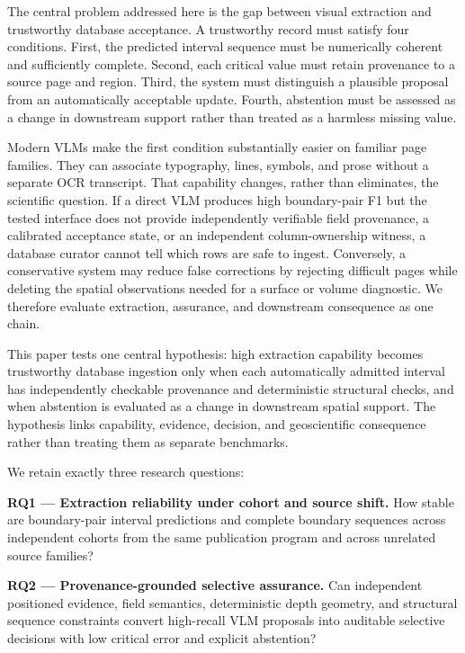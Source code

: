 \documentclass[a4paper,fleqn]{cas-sc}
\begin{document}
The central problem addressed here is the gap between visual extraction and trustworthy database acceptance. A trustworthy record must satisfy four conditions. First, the predicted interval sequence must be numerically coherent and sufficiently complete. Second, each critical value must retain provenance to a source page and region. Third, the system must distinguish a plausible proposal from an automatically acceptable update. Fourth, abstention must be assessed as a change in downstream support rather than treated as a harmless missing value.

Modern VLMs make the first condition substantially easier on familiar page families. They can associate typography, lines, symbols, and prose without a separate OCR transcript. That capability changes, rather than eliminates, the scientific question. If a direct VLM produces high boundary-pair F1 but the tested interface does not provide independently verifiable field provenance, a calibrated acceptance state, or an independent column-ownership witness, a database curator cannot tell which rows are safe to ingest. Conversely, a conservative system may reduce false corrections by rejecting difficult pages while deleting the spatial observations needed for a surface or volume diagnostic. We therefore evaluate extraction, assurance, and downstream consequence as one chain.

This paper tests one central hypothesis: high extraction capability becomes trustworthy database ingestion only when each automatically admitted interval has independently checkable provenance and deterministic structural checks, and when abstention is evaluated as a change in downstream spatial support. The hypothesis links capability, evidence, decision, and geoscientific consequence rather than treating them as separate benchmarks.

We retain exactly three research questions:

\textbf{RQ1 --- Extraction reliability under cohort and source shift.} How stable are boundary-pair interval predictions and complete boundary sequences across independent cohorts from the same publication program and across unrelated source families?

\textbf{RQ2 --- Provenance-grounded selective assurance.} Can independent positioned evidence, field semantics, deterministic depth geometry, and structural sequence constraints convert high-recall VLM proposals into auditable selective decisions with low critical error and explicit abstention?
\end{document}
